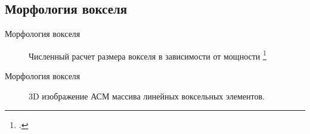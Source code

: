 \documentclass[aspectratio=169]{beamer}
\begin{document}
\subsection{Морфология вокселя}

\begin{frame}{Морфология вокселя}
        \begin{figure}
            \begin{minipage}{\linewidth}
                \centering
            \end{minipage}
            \caption*{Численный расчет размера вокселя в зависимости от мощности \footcite{Mechrambald}}
        \end{figure}
\end{frame}

\begin{frame}{Морфология вокселя}
        \begin{figure}
            \caption*{3D изображение АСМ массива линейных воксельных элементов.}
        \end{figure}
\end{frame}
\end{document}

